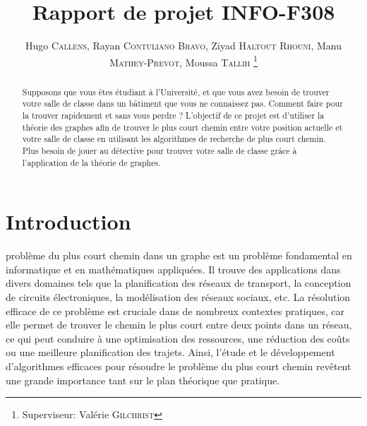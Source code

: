 \documentclass[journal, a4paper]{IEEEtran}
\begin{document}
	\title{Rapport de projet INFO-F308}
	\author{
		Hugo \textsc{Callens},
		Rayan \textsc{Contuliano Bravo},
		Ziyad \textsc{Haltout Rhouni},
		Manu  \textsc{Mathey-Prevot},
		Moussa \textsc{Tallih}
		\thanks{Superviseur: Valérie \textsc{Gilchrist}}
	}
	\maketitle


\begin{abstract}
	Supposons que vous êtes étudiant à l'Université, et que vous avez besoin de
	trouver votre salle de classe dans un bâtiment que vous ne connaissez pas.
	Comment faire pour la trouver rapidement et sans vous perdre ? L'objectif de
	ce projet est d'utiliser la théorie des graphes afin de trouver le plus court
	chemin entre votre position actuelle et votre salle de classe en utilisant
	les algorithmes de recherche de plus court chemin. Plus besoin de jouer au
	détective pour trouver votre salle de classe grâce à l'application de la
	théorie de graphes.

\end{abstract}

\section{Introduction}
	 problème du plus court chemin dans un graphe est un problème fondamental en informatique et en mathématiques appliquées. Il trouve des applications dans divers domaines tels que la planification des réseaux de transport, la conception de circuits électroniques, la modélisation des réseaux sociaux, etc. La résolution efficace de ce problème est cruciale dans de nombreux contextes pratiques, car elle permet de trouver le chemin le plus court entre deux points dans un réseau, ce qui peut conduire à une optimisation des ressources, une réduction des coûts ou une meilleure planification des trajets. Ainsi, l'étude et le développement d'algorithmes efficaces pour résoudre le problème du plus court chemin revêtent une grande importance tant sur le plan théorique que pratique.
\end{document}
